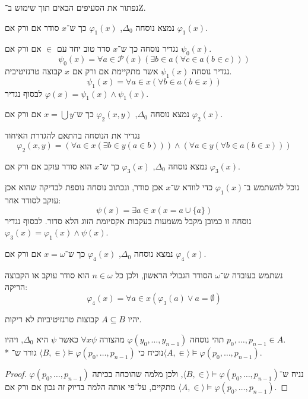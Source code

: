 \Question{}
נפתור את הסעיפים הבאים תוך שימוש ב־Z.

\Subquestion{}
נמצא נוסחה $\Delta_0$, $\varphi_1(x)$ כך ש־$x$ סודר אם ורק אם $\varphi_1(x)$.
\begin{solution}
	נגדיר נוסחה כך ש־$x$ סדר טוב יחד עם $\in$ אם ורק אם $\psi_0(x)$.
	\[
		\psi_0(x) = \forall a \in \mathcal{P}(x) (\exists b \in a (\forall c \in a (b \in c)))
	\]
	נגדיר נוסחה $\psi_1(x)$ אשר מתקיימת אם ורק אם $x$ קבוצה טרנזיטיבית.
	\[
		\psi_1(x) = \forall a \in x (\forall b \in a ( b \in x))
	\]
	לבסוף נגדיר $\varphi(x) = \psi_1(x) \land \psi_1(x)$.
\end{solution}

\Subquestion{}
נמצא נוסחה $\Delta_0$, $\varphi_2(x, y)$ כך ש־$x = \bigcup y$ אם ורק אם $\varphi_2(x)$.
\begin{solution}
	נגדיר את הנוסחה בהתאם להגדרת האיחוד
	\[
		\varphi_2(x, y) = (\forall a \in x (\exists b \in y (a \in b))) \land (\forall a \in y (\forall b \in a (b \in x)))
	\]
\end{solution}
נמצא נוסחה $\Delta_0$, $\varphi_3(x)$ כך ש־$x$ הוא סודר עוקב אם ורק אם $\varphi_3(x)$.
\begin{solution}
	נוכל להשתמש ב־$\varphi_1(x)$ כדי לוודא ש־$x$ אכן סודר, ונכתוב נוסחה נוספת לבדיקה שהוא אכן עוקב לסודר אחר:
	\[
		\psi(x) = \exists a \in x (x = a \cup \{ a \})
	\]
	נוסחה זו כמובן מקבל משמעות בעקבות אקסיומת הזוג הלא סדור.
	לבסוף נגדיר $\varphi_3(x) = \varphi_1(x) \land \psi(x)$.
\end{solution}

\Subquestion{}
נמצא נוסחה $\Delta_0$, $\varphi_4(x)$ כך ש־$x = \omega$ אם ורק אם $\varphi_4(x)$.
\begin{solution}
	נשתמש בעובדה ש־$\omega$ הסודר הגבולי הראשון, ולכן כל $n \in \omega$ הוא סודר עוקב או הקבוצה הריקה:
	\[
		\varphi_4(x) = \forall a \in x (\varphi_3(a) \lor a = \emptyset)
	\]
\end{solution}

\Question{}
יהיו $A \subseteq B$ קבוצות טרנזיטיביות לא ריקות.

\Subquestion{}
תהי נוסחה $\varphi(y_0, \dots, y_{n - 1})$ מהצורה $\forall x \psi$ כאשר $\psi$ היא $\Delta_0$, ויהיו $p_0, \dots, p_{n - 1} \in A$. \\*
נוכיח כי $\langle B, \in \rangle \models \varphi(p_0, \dots, p_{n - 1})$ גורר ש־$\langle A, \in \rangle \models \varphi(p_0, \dots, p_{n - 1})$.
\begin{proof}
	נניח ש־$\langle B, \in \rangle \models \varphi(p_0, \dots, p_{n - 1})$, ולכן מלמה שהוכחה בכיתה $\varphi(p_0, \dots, p_{n - 1})$ מתקיים,
	על־פי אותה הלמה בדיוק זה נכון אם ורק אם $\langle A, \in \rangle \models \varphi(p_0, \dots, p_{n - 1})$.
\end{proof}


